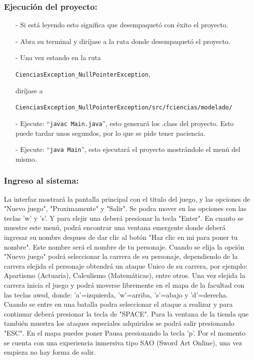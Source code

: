 \documentclass{article}
\newcommand{\code}[1]{\textcolor{white!25!black}{\texttt{#1}}}
\begin{document}
\subsubsection*{Ejecución del proyecto:}
\begin{itemize}
\item[-] Si está leyendo esto significa que desempaquetó con éxito el proyecto.
\item[-] Abra su terminal y diríjase a la ruta donde desempaquetó el proyecto.
\item[-] Una vez estando en la ruta
  
  \code{CienciasException\_NullPointerException},
  
  diríjase a

  \code{CienciasException\_NullPointerException/src/fciencias/modelado/}
\item[-] Ejecute: “\code{javac Main.java}”, esto generará los .class del proyecto. Esto puede
  tardar unos segundos, por lo que se pide tener paciencia.
\item[-] Ejecute: “\code{java Main}”, esto ejecutará el proyecto mostrándole el menú del mismo.
\end{itemize}

\subsubsection*{Ingreso al sistema:}
La interfaz mostrará la pantalla principal con el titulo del juego, y las opciones de "Nuevo juego", "Proximamente" y "Salir".
Se podra mover en las opciones con las teclas 'w' y 's'. Y para elejir una deberá presionar la tecla "Enter".
En cuanto se muestre este menú, podrá encontrar una ventana emergente donde deberá ingresar su nombre despues de dar clic al botón "Haz clic en mi para poner tu nombre". Este nombre será el nombre de tu personaje.
Cuando se elija la opción "Nuevo juego" podrá seleccionar la carrera de su personaje, dependiendo de la carrera elejida el personaje obtendrá un ataque Unico de su carrera, por ejemplo: Apartismo (Actuaria), Calculismo (Matemáticas), entre otros.
Una vez elejida la carrera inicia el juego y podrá moverse libremente en el mapa de la facultad con las teclas awsd, donde: 'a'=izquierda, 'w'=arriba, 's'=abajo y 'd'=derecha.
Cuando se entre en una batalla podra seleccionar el ataque a realizar y para continuar deberá presionar la tecla de "SPACE".
Para la ventana de la tienda que también muestra los ataques especiales adquiridos se podrá salir presionando "ESC".
En el mapa puedes poner Pausa presionando la tecla 'p'.
Por el momento se cuenta con una experiencia inmersiva tipo SAO (Sword Art Online), una vez empieza no hay forma de salir.
\end{document}

